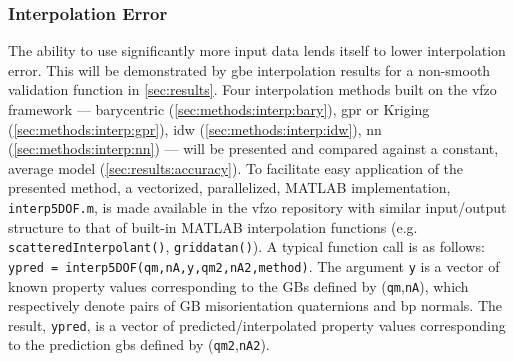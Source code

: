 \documentclass[final,twocolumn,12pt]{elsarticle}
\newcommand{\outpt}{prediction}
\newcommand{\vfzorepo}{\gls{vfzo} repository}
\begin{document}

\subsubsection{Interpolation Error} \label{sec:intro:interp-error}
The ability to use significantly more input data lends itself to lower interpolation error. This will be demonstrated by \gls{gbe} interpolation results for a non-smooth validation function in \cref{sec:results}.
Four interpolation methods built on the \gls{vfzo} framework --- barycentric (\cref{sec:methods:interp:bary}), \gls{gpr} or Kriging (\cref{sec:methods:interp:gpr}), \gls{idw} (\cref{sec:methods:interp:idw}), \gls{nn} (\cref{sec:methods:interp:nn}) --- will be presented and compared against a constant, average model (\cref{sec:results:accuracy}). To facilitate easy application of the presented method, a vectorized, parallelized, MATLAB implementation, \texttt{interp5DOF.m}, is made available in the \vfzorepo{} \cite{bairdFiveDegreeofFreedom5DOF2020} with similar input/output structure to that of built-in MATLAB interpolation functions (e.g. \texttt{scatteredInterpolant()}, \texttt{griddatan()}). A typical function call is as follows: \texttt{ypred = interp5DOF(qm,nA,y,qm2,nA2,method)}. The argument \texttt{y} is a vector of known property values corresponding to the GBs defined by (\texttt{qm},\texttt{nA}), which respectively denote pairs of GB misorientation quaternions and \gls{bp} normals. The result, \texttt{ypred}, is a vector of predicted/interpolated property values corresponding to the \outpt{} \glspl{gb} defined by (\texttt{qm2},\texttt{nA2}). %
\end{document}
